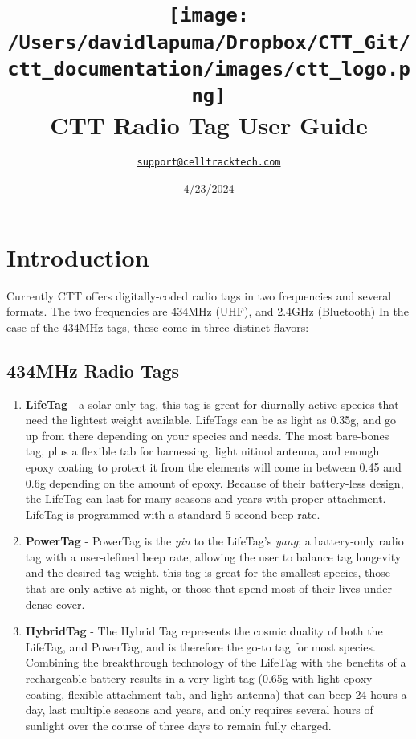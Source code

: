 \documentclass[
]{article}
\title{\texttt{[image: /Users/davidlapuma/Dropbox/CTT\_Git/ctt\_documentation/images/ctt\_logo.png]}\\
CTT Radio Tag User Guide}
\author{\href{mailto:support@celltracktech.com}{\nolinkurl{support@celltracktech.com}}}
\date{4/23/2024}
\begin{document}
\maketitle

{
\setcounter{tocdepth}{2}
\tableofcontents
}
\hypertarget{introduction}{%
\section{Introduction}\label{introduction}}

Currently CTT offers digitally-coded radio tags in two frequencies and
several formats. The two frequencies are 434MHz (UHF), and 2.4GHz
(Bluetooth) In the case of the 434MHz tags, these come in three distinct
flavors:

\hypertarget{mhz-radio-tags}{%
\subsection{434MHz Radio Tags}\label{mhz-radio-tags}}

\begin{enumerate}
\def\labelenumi{\arabic{enumi}.}
\item
  \textbf{LifeTag} - a solar-only tag, this tag is great for
  diurnally-active species that need the lightest weight available.
  LifeTags can be as light as 0.35g, and go up from there depending on
  your species and needs. The most bare-bones tag, plus a flexible tab
  for harnessing, light nitinol antenna, and enough epoxy coating to
  protect it from the elements will come in between 0.45 and 0.6g
  depending on the amount of epoxy. Because of their battery-less
  design, the LifeTag can last for many seasons and years with proper
  attachment. LifeTag is programmed with a standard 5-second beep rate.
\item
  \textbf{PowerTag} - PowerTag is the \emph{yin} to the LifeTag's
  \emph{yang}; a battery-only radio tag with a user-defined beep rate,
  allowing the user to balance tag longevity and the desired tag weight.
  this tag is great for the smallest species, those that are only active
  at night, or those that spend most of their lives under dense cover.
\item
  \textbf{HybridTag} - The Hybrid Tag represents the cosmic duality of
  both the LifeTag, and PowerTag, and is therefore the go-to tag for
  most species. Combining the breakthrough technology of the LifeTag
  with the benefits of a rechargeable battery results in a very light
  tag (0.65g with light epoxy coating, flexible attachment tab, and
  light antenna) that can beep 24-hours a day, last multiple seasons and
  years, and only requires several hours of sunlight over the course of
  three days to remain fully charged.
\end{enumerate}
\end{document}
